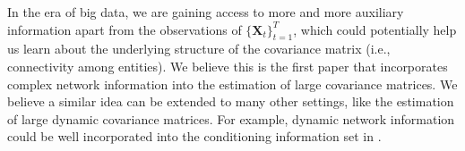 In the era of big data, we are gaining access to more and more auxiliary information apart from the observations of $\{\boldsymbol{X}_t\}_{t=1}^T$, which could potentially help us learn about the underlying structure of the covariance matrix (i.e., connectivity among entities). We believe this is the first paper that incorporates complex network information into the estimation of large covariance matrices. We believe a similar idea can be extended to many other settings, like the estimation of large dynamic covariance matrices. For example, dynamic network information could be well incorporated into the conditioning information set in \cite{chen2019new}.